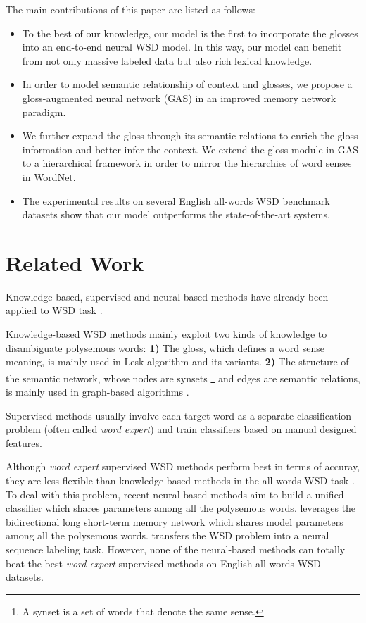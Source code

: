 \documentclass[11pt,a4paper]{article}
\begin{document}
The main contributions of this paper are listed as follows:
\begin{itemize}
\item To the best of our knowledge, our model is the first to incorporate the glosses into an end-to-end neural WSD model. In this way, our model can benefit from not only massive labeled data but also rich lexical knowledge.
\item In order to model semantic relationship of context and glosses, we propose a gloss-augmented neural network (GAS) in an improved memory network paradigm.
\item We further expand the gloss through its semantic relations to enrich the gloss information and better infer the context. We extend the gloss module in GAS to a hierarchical framework in order to mirror the hierarchies of word senses in WordNet.
\item The experimental results on several English all-words WSD benchmark datasets show that our model outperforms the state-of-the-art systems.
\end{itemize}

\section{Related Work}




Knowledge-based, supervised and neural-based methods have already been applied to WSD task \cite{Navigli2009}.


Knowledge-based WSD methods mainly exploit two kinds of knowledge to disambiguate polysemous words:
\textbf{1)} The gloss, which defines a word sense meaning, is mainly used in Lesk algorithm \cite{Lesk1986Lesk} and its variants.
\textbf{2)} The structure of the semantic network, whose nodes are synsets \footnote{A synset is a set of words that denote the same sense.} and edges are semantic relations, is mainly used in graph-based algorithms \cite{Agirre2014UKB,Moro2014Babelfy}.

Supervised methods \cite{Zhong2010IMS,Iacobacci2016} usually involve each target word as a separate classification problem ({often called \em word expert}) and train classifiers based on manual designed features.


Although {\em word expert} supervised WSD methods perform best in terms of accuray, they are less flexible than knowledge-based methods in the all-words WSD task \cite{Raganato2017}.
To deal with this problem, recent neural-based methods aim to build a unified classifier which shares parameters among all the polysemous words.
\citet{bilstm} leverages the bidirectional long short-term memory network which shares model parameters among all the polysemous words.
\citet{Raganato2017} transfers the WSD problem into a neural sequence labeling task.
However, none of the neural-based methods can totally beat the best {\em word expert} supervised methods on English all-words WSD datasets.
\end{document}
